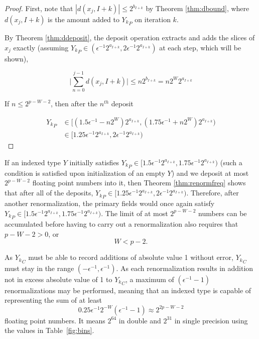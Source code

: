     \begin{proof}
    First, note that $|d(x_j, I + k)| \leq 2^{b_{I + k}}$ by Theorem \ref{thm:dbound}, where $d(x_j, I + k)$ is the amount added to ${Y_k}_P$ on iteration $k$.

    By Theorem \ref{thm:ddeposit}, the deposit operation extracts and adds the slices of $x_j$ exactly (assuming ${Y_k}_P \in (\epsilon^{-1} 2^{a_{I + k}}, 2  \epsilon^{-1} 2^{a_{I + k}})$ at each step, which will be shown),

    \begin{equation*}
    \bigl|\sum \limits_{n = 0}^{j - 1} d(x_j, I + k)\bigr| \leq n  2^{b_{I + k}} = n  2^{W}  2^{a_{I + k}}
    \end{equation*}

    If $n \leq 2^{p - W - 2}$, then after the $n^{th}$ deposit

    \begin{align*}
    {Y_k}_P &\in \bigl[(1.5  \epsilon^{-1} - n  2^W) 2^{a_{I + k}}, (1.75  \epsilon^{-1} + n  2^W) 2^{a_{I + k}}\bigr) \\
    &\in [1.25  \epsilon^{-1} 2^{a_{I + k}}, 2  \epsilon^{-1} 2^{a_{I + k}})
    \end{align*}
    \end{proof}

    If an indexed type $Y$ initially satisfies ${Y_k}_P \in [1.5  \epsilon^{-1} 2^{a_{I + k}}, 1.75  \epsilon^{-1} 2^{a_{I + k}})$ (such a condition is satisfied upon initialization of an empty $Y$) and we deposit at most $2^{p - W - 2}$ floating point numbers into it, then Theorem \ref{thm:renormfreq} shows that after all of the deposits, ${Y_k}_P \in [1.25  \epsilon^{-1} 2^{a_{I + k}}, 2  \epsilon^{-1} 2^{a_{I + k}})$. Therefore, after another renormalization, the primary fields would once again satisfy ${Y_k}_P \in [1.5  \epsilon^{-1} 2^{a_{I + k}}, 1.75  \epsilon^{-1} 2^{a_{I + k}})$.
    The limit of at most $2^{p-W-2}$ numbers can be accumulated before having to carry out a renormalization
    also requires that $p-W-2 > 0$, or 
    \begin{equation}
        W < p - 2.
    \end{equation}

    As ${Y_k}_C$ must be able to record additions of absolute value 1 without error, ${Y_k}_C$ must stay in the range $(-\epsilon^{-1}, \epsilon^{-1})$. As each renormalization results in addition not in excess absolute value of 1 to ${Y_k}_C$, a maximum of $(\epsilon^{-1} - 1)$ renormalizations may be performed, meaning that an indexed type is capable of representing the sum of at least
    \begin{equation}
      0.25\epsilon^{-1}2^{-W}  (\epsilon^{-1} - 1) \approx 2^{2  p - W - 2}
      \label{eq:totalfreq}
    \end{equation}
    floating point numbers. It means $2^{64}$ in double and $2^{31}$ in single precision using the values in Table~\ref{fig:bins}.

